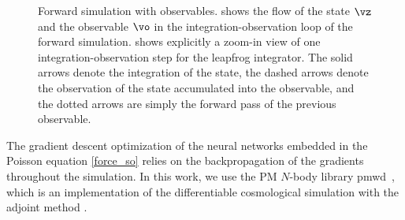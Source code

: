 \documentclass[modern, trackchanges, dvipsnames]{aastex631}
\newcommand{\pmwd}{{\usefont{T1}{nova}{m}{sl}pmwd}}
\newcommand{\half}{\nicefrac12}
\begin{document}
\begin{figure}[t]
{
}
\caption{Forward simulation with observables.
 shows the flow of the state $\vz$ and the
observable $\vo$ in the integration-observation loop of the forward
simulation.
 shows explicitly a zoom-in view of one integration-observation
step for the leapfrog integrator.
The solid arrows denote the integration of the state, the dashed arrows
denote the observation of the state accumulated into the observable, and the
dotted arrows are simply the forward pass of the previous observable.}
\end{figure}

The gradient descent optimization of the neural networks embedded in the
Poisson equation \eqref{force_so} relies on the backpropagation of the
gradients throughout the simulation.
In this work, we use the PM $N$-body library \pmwd\ \citep{Li2022b},
which is an implementation of the differentiable cosmological simulation
with the adjoint method \citep{Li2022a}.
\end{document}
